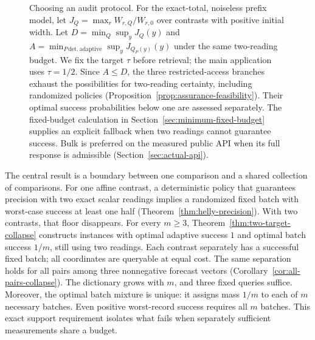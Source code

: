 \documentclass[12pt]{article}
\begin{document}
\begin{figure}[htbp]
\caption{Choosing an audit protocol. For the exact-total, noiseless prefix
model, let $J_Q=\max_r W_{r,Q}/W_{r,0}$ over contrasts with positive initial
width. Let $D=\min_Q\sup_y J_Q(y)$ and
$A=\min_{P\,\mathrm{det.\ adaptive}}\sup_y J_{Q_P(y)}(y)$ under the same
two-reading budget. We fix the target $\tau$ before retrieval; the main
application uses $\tau=1/2$. Since $A\leq D$, the three restricted-access
branches exhaust the possibilities for two-reading certainty, including randomized
policies (Proposition~\ref{prop:assurance-feasibility}). Their optimal
success probabilities below one are assessed separately. The fixed-budget
calculation in Section~\ref{sec:minimum-fixed-budget} supplies an explicit
fallback when two readings cannot guarantee success. Bulk is preferred on the measured public
API when its full response is admissible (Section~\ref{sec:actual-api}).}
\label{fig:audit-workflow}
\end{figure}

The central result is a boundary between one comparison and a shared
collection of comparisons. For one affine contrast, a deterministic policy
that guarantees precision with two exact scalar readings implies a
randomized fixed batch with worst-case success at least one half
(Theorem~\ref{thm:helly-precision}). With two contrasts, that floor disappears.
For every $m\geq3$, Theorem~\ref{thm:two-target-collapse} constructs instances
with optimal adaptive success $1$ and optimal batch success $1/m$, still
using two readings. Each contrast separately has a successful fixed batch;
all coordinates are queryable at equal cost. The same separation holds for
all pairs among three nonnegative forecast vectors
(Corollary~\ref{cor:all-pairs-collapse}). The dictionary grows with $m$,
and three fixed queries suffice. Moreover, the optimal batch mixture is
unique: it assigns mass $1/m$ to each of $m$ necessary batches. Even positive
worst-record success requires all $m$ batches. This exact support requirement
isolates what fails when separately sufficient measurements share a budget.
\end{document}
